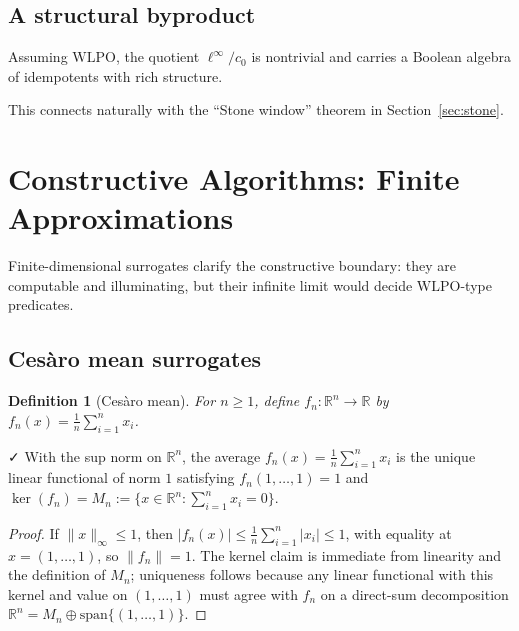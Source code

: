 \documentclass[11pt]{article}
\newtheorem{definition}[theorem]{Definition}
\newenvironment{defi}{\begin{definition}}{\end{definition}}
\newcommand{\leanok}{\textsf{\small \textcolor{green!70!black}{✓}}}
\newcommand{\R}{\mathbb{R}}
\newcommand{\linf}{\ell^\infty}
\newcommand{\cnull}{c_0}
\newcommand{\WLPO}{\mathrm{WLPO}}
\begin{document}
\subsection{A structural byproduct}

\begin{thm}
Assuming $\WLPO$, the quotient $\linf/\cnull$ is nontrivial and carries a Boolean algebra of idempotents with rich structure.
\end{thm}

This connects naturally with the ``Stone window'' theorem in Section~\ref{sec:stone}.

\section{Constructive Algorithms: Finite Approximations}

Finite-dimensional surrogates clarify the constructive boundary: they are computable and illuminating, but their infinite limit would decide $\WLPO$-type predicates.

\subsection{Ces\`aro mean surrogates}

\begin{defi}[Ces\`aro mean]
For $n\ge 1$, define $f_n:\R^n\to\R$ by $f_n(x)=\frac{1}{n}\sum_{i=1}^n x_i$.
\end{defi}

\begin{thm}\label{thm:finite-hb}\leanok
With the sup norm on $\R^n$, the average $f_n(x)=\frac{1}{n}\sum_{i=1}^n x_i$ is the unique linear functional of norm $1$ satisfying $f_n(1,\dots,1)=1$ and $\ker(f_n)=M_n:=\{x\in\R^n:\sum_{i=1}^n x_i=0\}$.
\end{thm}

\begin{proof}
If $\|x\|_\infty\le 1$, then $|f_n(x)|\le \frac{1}{n}\sum_{i=1}^n|x_i|\le 1$, with equality at $x=(1,\dots,1)$, so $\|f_n\|=1$. The kernel claim is immediate from linearity and the definition of $M_n$; uniqueness follows because any linear functional with this kernel and value on $(1,\dots,1)$ must agree with $f_n$ on a direct-sum decomposition $\R^n=M_n\oplus \mathrm{span}\{(1,\dots,1)\}$.
\end{proof}
\end{document}
